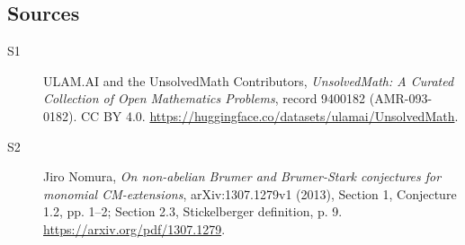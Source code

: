 \documentclass[11pt]{article}
\begin{document}
\subsection{Sources}
\begin{description}
\item[\hypertarget{source:9400182:1}{S1}] ULAM.AI and the UnsolvedMath Contributors, \emph{UnsolvedMath: A Curated Collection of Open Mathematics Problems}, record 9400182 (AMR-093-0182). CC BY 4.0. \url{https://huggingface.co/datasets/ulamai/UnsolvedMath}.
\item[\hypertarget{source:9400182:2}{S2}] Jiro Nomura, \emph{On non-abelian Brumer and Brumer-Stark conjectures for monomial CM-extensions}, arXiv:1307.1279v1 (2013), Section 1, Conjecture 1.2, pp. 1--2; Section 2.3, Stickelberger definition, p. 9. \url{https://arxiv.org/pdf/1307.1279}.
\end{description}
\label{end:9400182}
\end{document}

